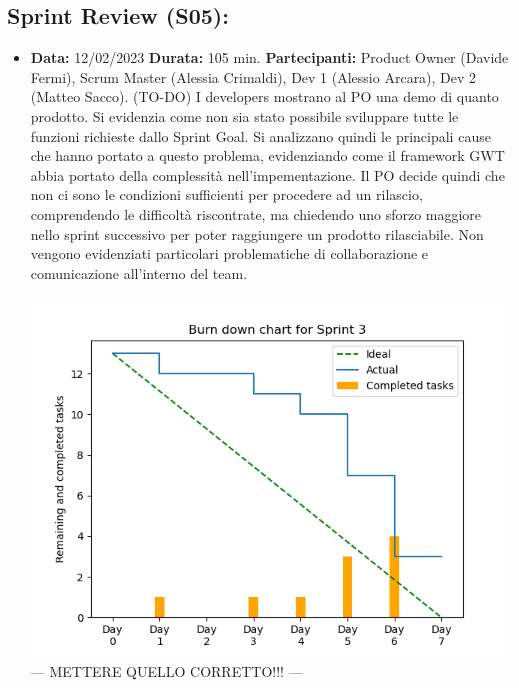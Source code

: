 \documentclass[a4paper, oneside]{article}
\newcommand\uno{Scrum Master (Alessia Crimaldi), Dev 1 (Alessio Arcara), Dev 2 (Matteo Sacco).}
\newcommand\unoP{Product Owner (Davide Fermi), }
\begin{document}
\begin{landscape}
\begin{tabular}{ | p{7cm} | p{3cm} | p{2.8cm} | p{3cm} | p{7.2cm}| }
        \end{tabular}

        \newpage
        \normalsize
        \subsection{Sprint Review (S05):}
        \begin{itemize}
            \item \textbf{Data:} 12/02/2023
            \newline \textbf{Durata:} 105 min.
            \newline \textbf{Partecipanti:} \unoP \uno
            \newline
            \newline (TO-DO) I developers mostrano al PO una demo di quanto prodotto. Si evidenzia come non sia stato possibile sviluppare tutte le funzioni richieste dallo Sprint Goal. Si analizzano quindi le principali cause che hanno portato a questo problema, evidenziando come il framework GWT abbia portato della complessità nell'impementazione. Il PO decide quindi che non ci sono le condizioni sufficienti per procedere ad un rilascio, comprendendo le difficoltà riscontrate, ma chiedendo uno sforzo maggiore nello sprint successivo per poter raggiungere un prodotto rilasciabile. Non vengono evidenziati particolari problematiche di collaborazione e comunicazione all'interno del team.

            \includegraphics[scale=0.8]{Sprint03_BurnDownChart}
            --- METTERE QUELLO CORRETTO!!! ---
        \end{itemize}


\end{landscape}
\end{document}
